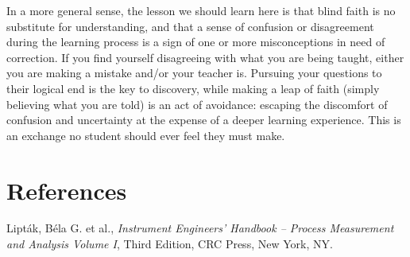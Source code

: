 In a more general sense, the lesson we should learn here is that blind faith is no substitute for understanding, and that a sense of confusion or disagreement during the learning process is a sign of one or more misconceptions in need of correction.  If you find yourself disagreeing with what you are being taught, either you are making a mistake and/or your teacher is.  Pursuing your questions to their logical end is the key to discovery, while making a leap of faith (simply believing what you are told) is an act of avoidance: escaping the discomfort of confusion and uncertainty at the expense of a deeper learning experience.  This is an exchange no student should ever feel they must make.







\filbreak
\section*{References}


\noindent
Lipt\'ak, B\'ela G. et al., \textit{Instrument Engineers' Handbook -- Process Measurement and Analysis Volume I}, Third Edition, CRC Press, New York, NY.
















